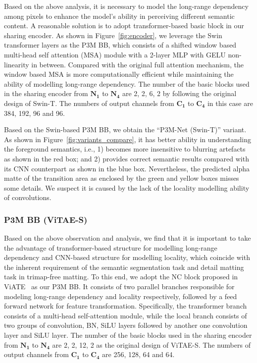 \documentclass[twocolumn]{svjour3}
\begin{document}
Based on the above analysis, it is necessary to model the long-range dependency among pixels to enhance the model's ability in perceiving different semantic content. A reasonable solution is to adopt transformer-based basic block in our sharing encoder. As shown in Figure~\ref{fig:encoder}, we leverage the Swin~\citep{swin} transformer layers as the P3M BB, which consists of a shifted window based multi-head self attention (MSA) module with a 2-layer MLP with GELU non-linearity in between. Compared with the original full attention mechanism, the window based MSA is more computationally efficient while maintaining the ability of modelling long-range dependency. The number of the basic blocks used in the sharing encoder from $\mathbf{N_1}$ to $\mathbf{N_4}$ are 2, 2, 6, 2 by following the original design of Swin-T. The numbers of output channels from $\mathbf{C_1}$ to $\mathbf{C_4}$ in this case are 384, 192, 96 and 96.

Based on the Swin-based P3M BB, we obtain the ``P3M-Net (Swin-T)'' variant. As shown in Figure~\ref{fig:variants_compare}, it has better ability in understanding the foreground semantics, i.e., 1) becomes more insensitive to blurring artefacts as shown in the red box; and 2) provides correct semantic results compared with its CNN counterpart as shown in the blue box. Nevertheless, the predicted alpha matte of the transition area as enclosed by the green and yellow boxes misses some details. We suspect it is caused by the lack of the locality modelling ability of convolutions.

\subsubsection{P3M BB (ViTAE-S)}

Based on the above observation and analysis, we find that it is important to take the advantage of transformer-based structure for modelling long-range dependency and CNN-based structure for modelling locality, which coincide with the inherent requirement of the semantic segmentation task and detail matting task in trimap-free matting. To this end, we adopt the NC block proposed in ViATE~\citep{vitae} as our P3M BB. It consists of two parallel branches responsible for modeling long-range dependency and locality respectively, followed by a feed forward network for feature transformation. Specifically, the transformer branch consists of a multi-head self-attention module, while the local branch consists of two groups of convolution, BN, SiLU layers followed by another one convolution layer and SiLU layer. The number of the basic blocks used in the sharing encoder from $\mathbf{N_1}$ to $\mathbf{N_4}$ are 2, 2, 12, 2 as the original design of ViTAE-S. The numbers of output channels from $\mathbf{C_1}$ to $\mathbf{C_4}$ are 256, 128, 64 and 64.
\end{document}
